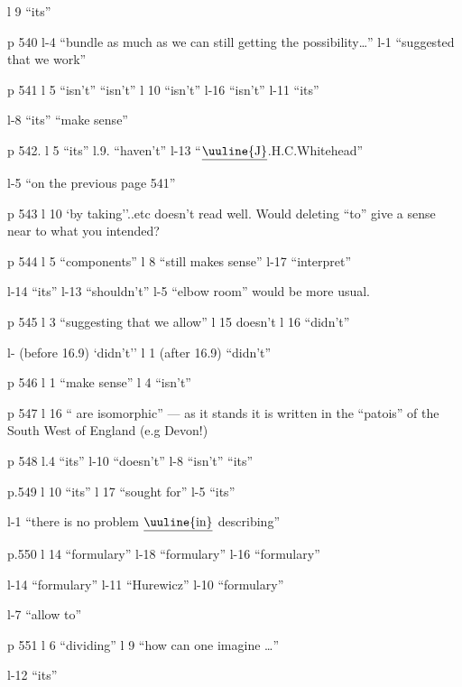 l 9 ``its''

p 540  l-4 ``bundle as much as we can   still getting the possibility\ldots'' \quad l-1 ``suggested that we work''

p 541 l 5 ``isn't'' ``isn't'' \quad l 10 ``isn't'' \quad l-16 ``isn't'' \quad l-11 ``its''

l-8 ``its'' ``make sense''

p 542. l 5 ``its'' \quad l.9. ``haven't'' \quad l-13 ``$\underline{\text{\uuline{J}}}$.H.C.Whitehead''

l-5 ``on the previous page 541''

p 543 l 10 `by taking''..etc doesn't read well. Would deleting ``to'' give  a sense near to what you intended?

p 544 l 5 ``components'' \quad l 8 ``still makes sense'' \quad l-17 ``interpret''

l-14 ``its'' \quad l-13 ``shouldn't'' \quad l-5 ``elbow room'' would be more usual.

p 545 l 3 ``suggesting that we allow'' \quad l 15 doesn't \quad l 16 ``didn't''

l- (before 16.9) `didn't'' \quad l 1 (after 16.9) ``didn't''

p 546 l 1 ``make sense'' \quad l 4 ``isn't''

p 547 l 16 `` are isomorphic'' --- as it stands it is written\unsure{:} in the ``patois'' of the South West of England (e.g Devon!)

p 548 l.4 ``its'' \quad l-10 ``doesn't'' \quad l-8 ``isn't'' ``its''

p.549 l 10 ``its'' \quad l 17 ``sought for'' \quad {} \quad l-5 ``its''

l-1 ``there is no problem $\underline{\text{\uuline{in}}}$ describing''

p.550 l 14 ``formulary'' \quad l-18 ``formulary'' \quad l-16 ``formulary''

l-14 ``formulary'' \quad l-11 ``Hurewicz'' \quad l-10 ``formulary''

l-7 ``allow  to''

p 551 l 6 ``dividing'' \quad l 9 ``how can one imagine \ldots''

l-12 ``its''

